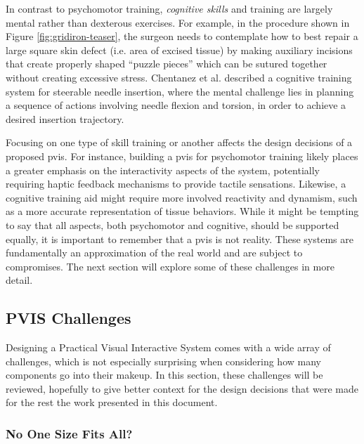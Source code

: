 In contrast to psychomotor training, \emph{cognitive skills} and
training are largely mental rather than dexterous exercises. For
example, in the procedure shown in Figure \ref{fig:gridiron-teaser},
the surgeon needs to contemplate how to best repair a large square
skin defect (i.e. area of excised tissue) by making auxiliary
incisions that create properly shaped ``puzzle pieces'' which can be
sutured together without creating excessive stress. Chentanez et al.\!
 described a cognitive training system
for steerable needle insertion, where the mental challenge lies in
planning a sequence of actions involving needle flexion and torsion,
in order to achieve a desired insertion trajectory.

Focusing on one type of skill training or another affects the design
decisions of a proposed \gls{pvis}. For instance, building a
\gls{pvis} for psychomotor training likely places a greater emphasis
on the interactivity aspects of the system, potentially requiring
haptic feedback mechanisms to provide tactile sensations. Likewise, a
cognitive training aid might require more involved reactivity and
dynamism, such as a more accurate representation of tissue
behaviors. While it might be tempting to say that all aspects, both
psychomotor and cognitive, should be supported equally, it is
important to remember that a \gls{pvis} is not reality. These systems
are fundamentally an approximation of the real world and are subject
to compromises. The next section will explore some of these challenges
in more detail. 

\subsection{PVIS Challenges}

Designing a Practical Visual Interactive System comes with a wide
array of challenges, which is not especially surprising when
considering how many components go into their makeup. In this section,
these challenges will be reviewed, hopefully to give better context
for the design decisions that were made for the rest the work
presented in this document.

\subsubsection{No One Size Fits All?}

